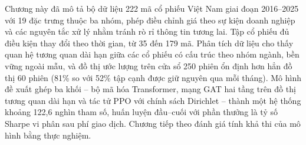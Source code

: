 Chương này đã mô tả bộ dữ liệu 222 mã cổ phiếu Việt Nam giai đoạn 2016--2025 với 19 đặc trưng thuộc ba nhóm, phép điều chỉnh giá theo sự kiện doanh nghiệp và các nguyên tắc xử lý nhằm tránh rò rỉ thông tin tương lai. Tập cổ phiếu đủ điều kiện thay đổi theo thời gian, từ 35 đến 179 mã. Phân tích dữ liệu cho thấy quan hệ tương quan dài hạn giữa các cổ phiếu có cấu trúc theo nhóm ngành, bền vững ngoài mẫu, và đồ thị ước lượng trên cửa sổ 250 phiên ổn định hơn hẳn đồ thị 60 phiên (81\% so với 52\% tập cạnh được giữ nguyên qua mỗi tháng). Mô hình đề xuất ghép ba khối -- bộ mã hóa Transformer, mạng GAT hai tầng trên đồ thị tương quan dài hạn và tác tử PPO với chính sách Dirichlet -- thành một hệ thống khoảng 122,6 nghìn tham số, huấn luyện đầu--cuối với phần thưởng là tỷ số Sharpe vi phân sau phí giao dịch. Chương tiếp theo đánh giá tính khả thi của mô hình bằng thực nghiệm.

